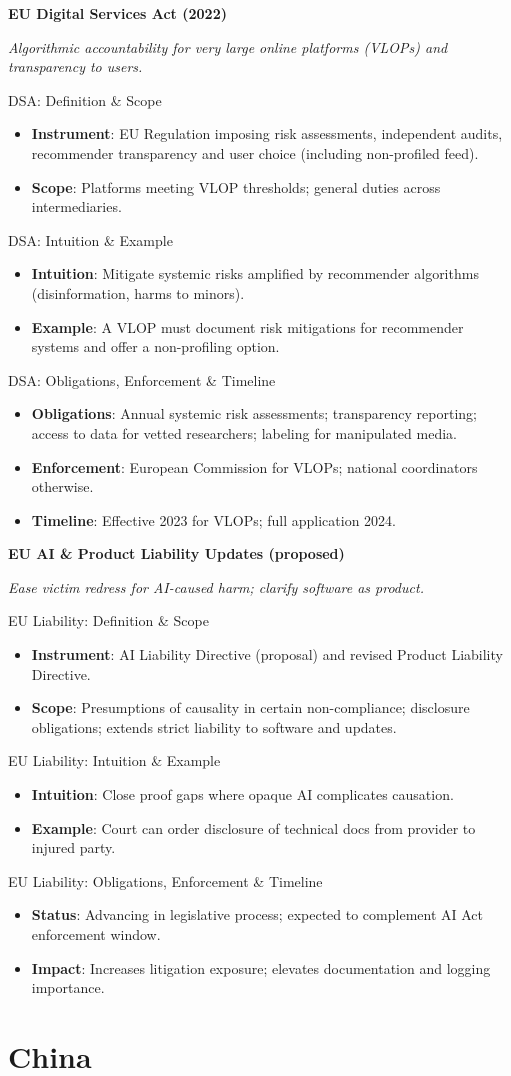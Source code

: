 \documentclass[aspectratio=169]{beamer}
\newcommand{\RegTitle}[2]{%
  \begin{frame}[plain]
    \centering
    \vfill
    {\usebeamerfont{title}\usebeamercolor[fg]{title}\LARGE \textbf{#1}\par}
    \vspace{0.4em}
    {\small \itshape #2\par}
    \vfill
  \end{frame}
}
\newcommand{\RegDef}[2]{%
  \begin{frame}{#1: Definition \& Scope}
    \begin{itemize}
      #2
    \end{itemize}
  \end{frame}
}
\newcommand{\RegIntuition}[2]{%
  \begin{frame}{#1: Intuition \& Example}
    \begin{itemize}
      #2
    \end{itemize}
  \end{frame}
}
\newcommand{\RegCompliance}[2]{%
  \begin{frame}{#1: Obligations, Enforcement \& Timeline}
    \begin{itemize}
      #2
    \end{itemize}
  \end{frame}
}
\begin{document}
\RegTitle{EU Digital Services Act (2022)}{Algorithmic accountability for very large online platforms (VLOPs) and transparency to users.}
\RegDef{DSA}{%
  \item \textbf{Instrument}: EU Regulation imposing risk assessments, independent audits, recommender transparency and user choice (including non-profiled feed).
  \item \textbf{Scope}: Platforms meeting VLOP thresholds; general duties across intermediaries.
}
\RegIntuition{DSA}{%
  \item \textbf{Intuition}: Mitigate systemic risks amplified by recommender algorithms (disinformation, harms to minors).
  \item \textbf{Example}: A VLOP must document risk mitigations for recommender systems and offer a non-profiling option.
}
\RegCompliance{DSA}{%
  \item \textbf{Obligations}: Annual systemic risk assessments; transparency reporting; access to data for vetted researchers; labeling for manipulated media.
  \item \textbf{Enforcement}: European Commission for VLOPs; national coordinators otherwise.
  \item \textbf{Timeline}: Effective 2023 for VLOPs; full application 2024.
}

\RegTitle{EU AI \& Product Liability Updates (proposed)}{Ease victim redress for AI-caused harm; clarify software as product.}
\RegDef{EU Liability}{%
  \item \textbf{Instrument}: AI Liability Directive (proposal) and revised Product Liability Directive.
  \item \textbf{Scope}: Presumptions of causality in certain non-compliance; disclosure obligations; extends strict liability to software and updates.
}
\RegIntuition{EU Liability}{%
  \item \textbf{Intuition}: Close proof gaps where opaque AI complicates causation.
  \item \textbf{Example}: Court can order disclosure of technical docs from provider to injured party.
}
\RegCompliance{EU Liability}{%
  \item \textbf{Status}: Advancing in legislative process; expected to complement AI Act enforcement window.
  \item \textbf{Impact}: Increases litigation exposure; elevates documentation and logging importance.
}

\section{China}
\end{document}
